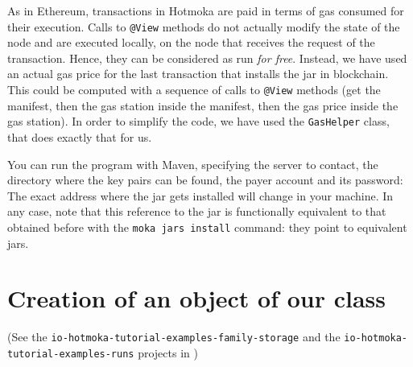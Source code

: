 \begin{commentbox}
As in Ethereum, transactions in Hotmoka are paid
in terms of gas consumed for their execution.
Calls to \texttt{@View}
methods do not actually modify the state of the node
and are executed locally, on the
node that receives the request of the transaction. Hence, they can be considered
as run \emph{for free}. Instead, we have used an actual gas price for the last
transaction that installs the jar in blockchain. This could be computed with
a sequence of calls to \texttt{@View} methods (get the manifest, then the gas station
inside the manifest, then the gas price inside the gas station). In order to
simplify the code, we have used the \texttt{GasHelper} class, that does exactly that for us.
\end{commentbox}

You can run the program with Maven, specifying the server to contact,
the directory where the key pairs can be found, the payer account and its password:
%
%
The exact address where the jar gets installed
will change in your machine. In any case, note that this reference
to the jar is functionally equivalent to that
obtained before with the \texttt{moka jars install} command: they point to equivalent jars.

\section{Creation of an object of our class}\label{sec:creation_object}

\begin{center}
  (See the \texttt{io-hotmoka-tutorial-examples-family-storage} and the
  \texttt{io-hotmoka-tutorial-examples-runs} projects in \hotmokaRepo{})
\end{center}

